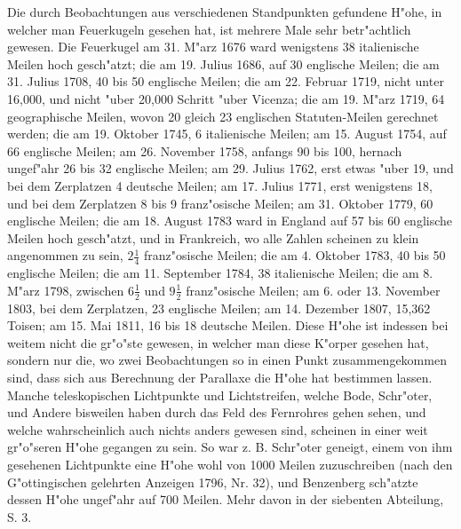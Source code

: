 \documentclass[a4paper, 11pt, oneside, polutonikogreek, german]{article}
\begin{document}
Die durch Beobachtungen aus verschiedenen Standpunkten gefundene H"ohe, in welcher man Feuerkugeln gesehen hat, ist mehrere Male sehr betr"achtlich gewesen. Die Feuerkugel am 31. M"arz 1676 ward wenigstens 38 italienische Meilen hoch gesch"atzt; die am 19. Julius 1686, auf 30 englische Meilen; die am 31. Julius 1708, 40 bis 50 englische Meilen; die am 22. Februar 1719, nicht unter 16,000, und nicht "uber 20,000 Schritt "uber Vicenza; die am 19. M"arz 1719, 64 geographische Meilen, wovon 20 gleich 23 englischen Statuten-Meilen gerechnet werden; die am 19. Oktober 1745, 6 italienische Meilen; am 15. August 1754, auf 66 englische Meilen; am 26. November 1758, anfangs 90 bis 100, hernach ungef"ahr 26 bis 32 englische Meilen; am 29. Julius 1762, erst etwas "uber 19, und bei dem Zerplatzen 4 deutsche Meilen; am 17. Julius 1771, erst wenigstens 18, und bei dem Zerplatzen 8 bis 9 franz"osische Meilen; am 31. Oktober 1779, 60 englische Meilen; die am 18. August 1783 ward in England auf 57 bis 60 englische Meilen hoch gesch"atzt, und in Frankreich, wo alle Zahlen scheinen zu klein angenommen zu sein, $\mathfrak{2\frac{1}{4}}$ franz"osische Meilen; die am 4. Oktober 1783, 40 bis 50 englische Meilen; die am 11. September 1784, 38 italienische Meilen; die am 8. M"arz 1798, zwischen $\mathfrak{6\frac{1}{2}}$ und $\mathfrak{9\frac{1}{2}}$ franz"osische Meilen; am 6. oder 13. November 1803, bei dem Zerplatzen, 23 englische Meilen; am 14. Dezember 1807, 15,362 Toisen; am 15. Mai 1811, 16 bis 18 deutsche Meilen. Diese H"ohe ist indessen bei weitem nicht die gr"o"ste gewesen, in welcher man diese K"orper gesehen hat, sondern nur die, wo zwei Beobachtungen so in einen Punkt zusammengekommen sind, dass sich aus Berechnung der Parallaxe die H"ohe hat bestimmen lassen. Manche teleskopischen Lichtpunkte und Lichtstreifen, welche Bode, Schr"oter, und Andere bisweilen haben durch das Feld des Fernrohres gehen sehen, und welche wahrscheinlich auch nichts anders gewesen sind, scheinen in einer weit gr"o"seren H"ohe gegangen zu sein. So war z. B. Schr"oter geneigt, einem von ihm gesehenen Lichtpunkte eine H"ohe wohl von 1000 Meilen zuzuschreiben (nach den G"ottingischen gelehrten Anzeigen 1796, Nr. 32), und Benzenberg sch"atzte dessen H"ohe ungef"ahr auf 700 Meilen. Mehr davon in der siebenten Abteilung, S. 3.
\end{document}
